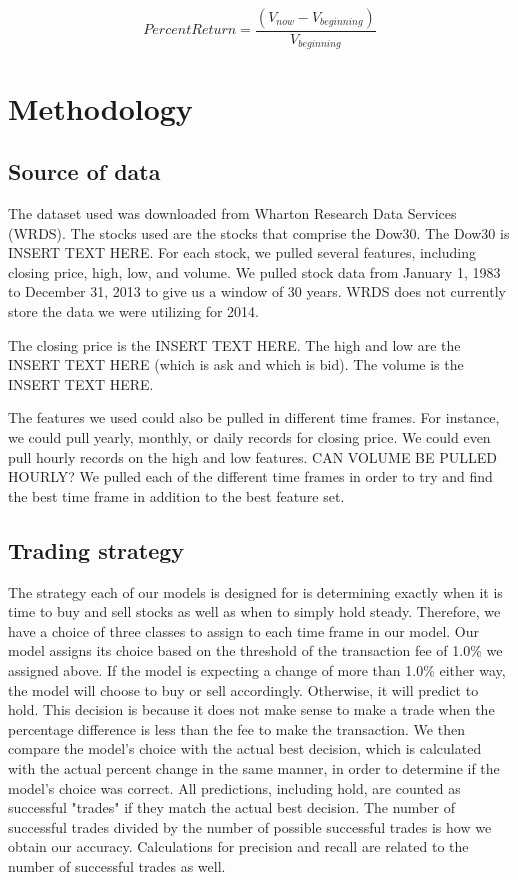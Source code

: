 \documentclass{article}
\begin{document}
$$
Percent Return = \frac{(V_{now} - V_{beginning})}{V_{beginning}}
$$

\section{Methodology}

\subsection{Source of data}
The dataset used was downloaded from Wharton Research Data Services (WRDS). The stocks used are the stocks that comprise the Dow30. The Dow30 is INSERT TEXT HERE. For each stock, we pulled several features, including closing price, high, low, and volume. We pulled stock data from January 1, 1983 to December 31, 2013 to give us a window of 30 years. WRDS does not currently store the data we were utilizing for 2014.

The closing price is the INSERT TEXT HERE. The high and low are the INSERT TEXT HERE (which is ask and which is bid). The volume is the INSERT TEXT HERE.

The features we used could also be pulled in different time frames. For instance, we could pull yearly, monthly, or daily records for closing price. We could even pull hourly records on the high and low features. CAN VOLUME BE PULLED HOURLY? We pulled each of the different time frames in order to try and find the best time frame in addition to the best feature set.

\subsection{Trading strategy}
The strategy each of our models is designed for is determining exactly when it is time to buy and sell stocks as well as when to simply hold steady. Therefore, we have a choice of three classes to assign to each time frame in our model. Our model assigns its choice based on the threshold of the transaction fee of 1.0\% we assigned above. If the model is expecting a change of more than 1.0\% either way, the model will choose to buy or sell accordingly. Otherwise, it will predict to hold. This decision is because it does not make sense to make a trade when the percentage difference is less than the fee to make the transaction. We then compare the model's choice with the actual best decision, which is calculated with the actual percent change in the same manner, in order to determine if the model's choice was correct. All predictions, including hold, are counted as successful "trades" if they match the actual best decision. The number of successful trades divided by the number of possible successful trades is how we obtain our accuracy. Calculations for precision and recall are related to the number of successful trades as well.
\end{document}
